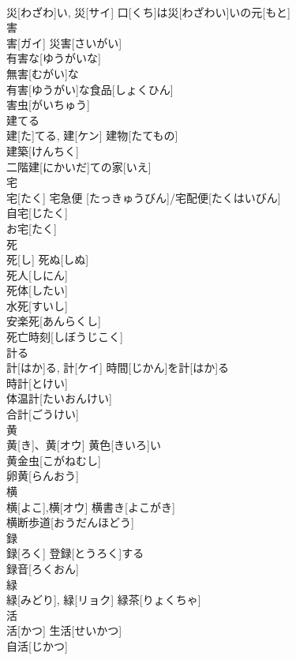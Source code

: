 \documentclass[8pt]{extreport}
\begin{document}
\begin{CJK}{UTF8}{min}
\\	災[わざわ]い, 災[サイ]	口[くち]は災[わざわい]いの元[もと] 
\\	害	
\\	害[ガイ]	災害[さいがい] 
\\	有害な[ゆうがいな] 
\\	無害[むがい]な 
\\	有害[ゆうがい]な食品[しょくひん] 
\\	害虫[がいちゅう] 
\\	建てる	
\\	建[た]てる, 建[ケン]	建物[たてもの] 
\\	建築[けんちく] 
\\	二階建[にかいだ]ての家[いえ] 
\\	宅	
\\	宅[たく]	宅急便 [たっきゅうびん]/宅配便[たくはいびん] 
\\	自宅[じたく] 
\\	お宅[たく] 
\\	死	
\\	死[し]	死ぬ[しぬ] 
\\	死人[しにん] 
\\	死体[したい] 
\\	水死[すいし] 
\\	安楽死[あんらくし] 
\\	死亡時刻[しぼうじこく] 
\\	計る	
\\	計[はか]る, 計[ケイ]	時間[じかん]を計[はか]る 
\\	時計[とけい] 
\\	体温計[たいおんけい] 
\\	合計[ごうけい] 
\\	黄	
\\	黄[き]、黄[オウ]	黄色[きいろ]い 
\\	黄金虫[こがねむし] 
\\	卵黄[らんおう] 
\\	横	
\\	横[よこ],横[オウ]	横書き[よこがき] 
\\	横断歩道[おうだんほどう] 
\\	録	
\\	録[ろく]	登録[とうろく]する 
\\	録音[ろくおん] 
\\	緑	
\\	緑[みどり], 緑[リョク]	緑茶[りょくちゃ]　
\\	活	
\\	活[かつ]	生活[せいかつ] 
\\	自活[じかつ] 

\end{CJK}
\end{document}
